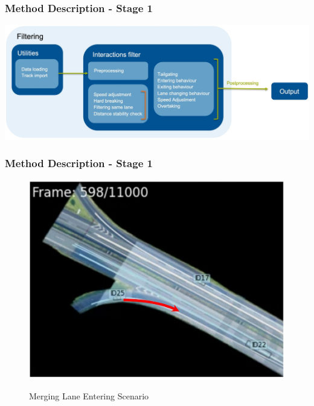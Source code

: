 \begin{frame}
  \frametitle{Method Description - Stage 1}
    \includegraphics[width=\textwidth]{figures/pictures_first_part/filtering_overview.jpeg}
\end{frame}


\begin{frame}

  \frametitle{Method Description - Stage 1}
  \begin{figure}

    \centering
    \begin{minipage}[b]{0.49\linewidth}
        \includegraphics[width=\textwidth]{figures/pictures_first_part/street_with_arrow.jpeg}

        \centering \footnotesize Merging Lane Entering Scenario
    \end{minipage}
    \begin{minipage}[b]{0.49\linewidth}


\end{minipage}
\end{figure}
\end{frame}
